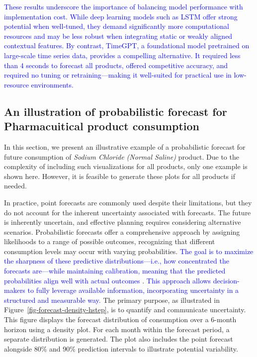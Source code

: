 \documentclass[
  authoryear,
  preprint,
  3p]{elsarticle}
\begin{document}
\textcolor{blue}{These results underscore the importance of balancing model performance with implementation cost. While deep learning models such as LSTM offer strong potential when well-tuned, they demand significantly more computational resources and may be less robust when integrating static or weakly aligned contextual features. By contrast, TimeGPT, a foundational model pretrained on large-scale time series data, provides a compelling alternative. It required less than 4 seconds to forecast all products, offered competitive accuracy, and required no tuning or retraining—making it well-suited for practical use in low-resource environments.}

\subsection{An illustration of probabilistic forecast for Pharmacuitical
product
consumption}\label{an-illustration-of-probabilistic-forecast-for-pharmacuitical-product-consumption}

In this section, we present an illustrative example of a probabilistic
forecast for future consumption of \emph{Sodium Chloride (Normal
Saline)} product. Due to the complexity of including such visualizations
for all products, only one example is shown here. However, it is
feasible to generate these plots for all products if needed.

In practice, point forecasts are commonly used despite their
limitations, but they do not account for the inherent uncertainty
associated with forecasts. The future is inherently uncertain, and
effective planning requires considering alternative scenarios.
Probabilistic forecasts offer a comprehensive approach by assigning
likelihoods to a range of possible outcomes, recognizing that different
consumption levels may occur with varying probabilities.
\textcolor{blue}{The goal is to maximize the sharpness of these predictive distributions—i.e., how concentrated the forecasts are—while maintaining calibration, meaning that the predicted probabilities align well with actual outcomes}
\citep{gneiting2014probabilistic}.
\textcolor{blue}{This approach allows decision-makers to fully leverage available information, incorporating uncertainty in a structured and measurable way.}
The primary purpose, as illustrated in
Figure~\ref{fig-forecast-density-hstep}, is to quantify and communicate
uncertainty. This figure displays the forecast distribution of
consumption over a 6-month horizon using a density plot. For each month
within the forecast period, a separate distribution is generated. The
plot also includes the point forecast alongside 80\% and 90\% prediction
intervals to illustrate potential variability.
\end{document}
